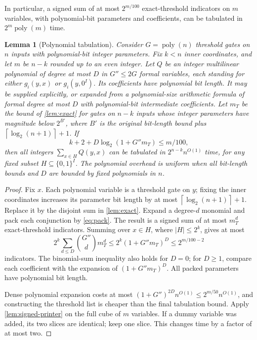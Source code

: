 \documentclass[11pt,letterpaper]{article}
\newtheorem{lemma}[theorem]{Lemma}
\theoremstyle{definition}
\theoremstyle{remark}
\newcommand{\poly}{\operatorname{poly}}
\newcommand{\ceil}[1]{\left\lceil #1\right\rceil}
\newcommand{\abs}[1]{\left|#1\right|}
\newcommand{\lgx}{\log_2}
\begin{document}
In particular, a signed sum of at most \(2^{m/100}\) exact-threshold
indicators on \(m\) variables, with polynomial-bit parameters and
coefficients, can be tabulated in \(2^m\poly(m)\) time.

\begin{lemma}[Polynomial tabulation]\label{lem:print}
Consider \(G=\poly(n)\) threshold gates on \(n\) inputs with
polynomial-bit integer parameters. Fix \(k<n\) inner coordinates,
and let \(m\) be \(n-k\) rounded up to an even integer.
Let \(Q\) be an integer multilinear polynomial of degree at most
\(D\) in \(G''\le2G\) formal variables, each standing for either
\(g_i(y,x)\) or \(g_i(y,0^I)\). Its coefficients have polynomial bit
length. It may be supplied explicitly, or expanded from a polynomial-size
arithmetic formula of formal degree at most \(D\) with polynomial-bit
intermediate coefficients.
Let \(m_T\) be the bound of \cref{lem:exact} for gates on \(n-k\)
inputs whose integer parameters have magnitude below \(2^{B'}\), where
\(B'\) is the original bit-length bound plus \(\ceil{\lgx(n+1)}+1\). If
\begin{equation}\label{eq:print-condition}
 k+2+D\lgx(1+G''m_T)\le m/100,
\end{equation}
then all integers \(\sum_{x\in H}Q(y,x)\) can be tabulated in
\(2^{n-k}n^{O(1)}\) time, for any fixed subset
\(H\subseteq\{0,1\}^I\). The polynomial overhead is uniform when
all bit-length bounds and \(D\) are bounded by fixed polynomials in \(n\).
\end{lemma}
\begin{proof}
Fix \(x\). Each polynomial variable is a threshold gate on \(y\);
fixing the inner coordinates increases its parameter bit length by
at most \(\ceil{\lgx(n+1)}+1\). Replace it by the disjoint sum in
\cref{lem:exact}. Expand a degree-\(d\) monomial and pack each
conjunction by \eqref{eq:pack}. The result is a signed sum of at most
\(m_T^d\) exact-threshold indicators. Summing over \(x\in H\), where
\(\abs H\le2^k\), gives at most
\[
 2^{k}\sum_{d\le D}\binom{G''}{d}m_T^d
 \le2^{k}(1+G''m_T)^D\le2^{m/100-2}
\]
indicators. The binomial-sum inequality also holds for \(D=0\);
for \(D\ge1\), compare each coefficient with the expansion of
\((1+G''m_T)^D\). All packed parameters have polynomial bit length.

Dense polynomial expansion costs at most
\((1+G'')^{2D}n^{O(1)}\le2^{m/50}n^{O(1)}\), and constructing the
threshold list is cheaper than the final tabulation bound. Apply
\cref{lem:signed-printer} on the full cube of \(m\) variables. If a dummy
variable was added, its two slices are identical; keep one slice.
This changes time by a factor of at most two.
\end{proof}
\end{document}
